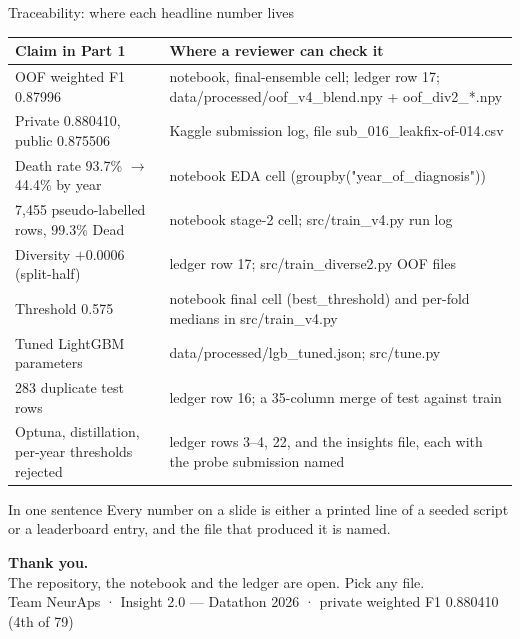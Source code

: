 \documentclass[aspectratio=169,10pt]{beamer}
\newcommand{\code}[1]{{\ttfamily #1}}
\newcommand{\file}[1]{{\ttfamily\footnotesize\color{navy}#1}}
\begin{document}
\begin{frame}{Traceability: where each headline number lives}
  \scriptsize
  \begin{tabular}{@{}p{4.3cm}p{8.4cm}@{}}
    \toprule
    \textbf{Claim in Part 1} & \textbf{Where a reviewer can check it}\\
    \midrule
    OOF weighted F1 0.87996 & notebook, final-ensemble cell; ledger row 17; \file{data/processed/oof\_v4\_blend.npy} + \file{oof\_div2\_*.npy}\\
    Private 0.880410, public 0.875506 & Kaggle submission log, file \file{sub\_016\_leakfix-of-014.csv}\\
    Death rate 93.7\% $\to$ 44.4\% by year & notebook EDA cell (\code{groupby("year\_of\_diagnosis")})\\
    7{,}455 pseudo-labelled rows, 99.3\% Dead & notebook stage-2 cell; \file{src/train\_v4.py} run log\\
    Diversity $+0.0006$ (split-half) & ledger row 17; \file{src/train\_diverse2.py} OOF files\\
    Threshold 0.575 & notebook final cell (\code{best\_threshold}) and per-fold medians in \file{src/train\_v4.py}\\
    Tuned LightGBM parameters & \file{data/processed/lgb\_tuned.json}; \file{src/tune.py}\\
    283 duplicate test rows & ledger row 16; a 35-column merge of test against train\\
    Optuna, distillation, per-year thresholds rejected & ledger rows 3--4, 22, and the insights file, each with the probe submission named\\
    \bottomrule
  \end{tabular}
  \vspace{6pt}
  \begin{block}{In one sentence}
    Every number on a slide is either a printed line of a seeded script or a leaderboard entry, and the file that produced it is named.
  \end{block}
\end{frame}

\begin{frame}[plain]
  \vspace{2.6cm}
  {\color{white}\Huge\bfseries Thank you.}\\[10pt]
  {\color{ruleline}\large The repository, the notebook and the ledger are open. Pick any file.}\\[22pt]
  {\color{ruleline}\ttfamily\small Team NeurAps \;·\; Insight 2.0 --- Datathon 2026 \;·\;
   private weighted F1 0.880410 (4th of 79)}
\end{frame}
\end{document}
